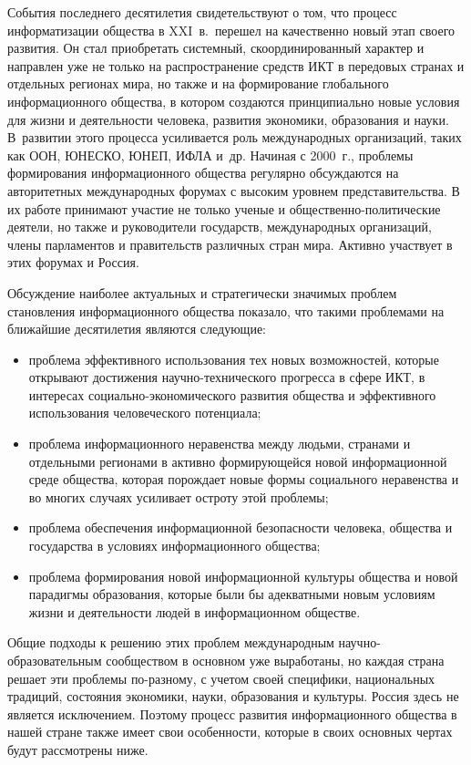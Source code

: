 \begin{multicols}{2}
   События последнего десятилетия свидетельствуют о том, что процесс информатизации
общества в XXI~в.\ перешел на качественно новый этап своего развития. Он стал 
приобретать системный, скоординированный характер и направлен уже не только на 
распространение средств ИКТ в передовых странах и отдельных регионах мира, но 
также и на формирование глобального информационного общества, в котором 
создаются принципиально новые условия для жизни и деятельности человека, 
развития экономики, образования и науки. В~развитии этого процесса усиливается 
роль международных организаций, таких как ООН, ЮНЕСКО, ЮНЕП, ИФЛА и~др. Начиная 
с 2000~г., проблемы формирования информационного общества регулярно обсуждаются 
на авторитетных международных форумах с высоким уровнем представительства. В их 
работе принимают участие не только ученые и общественно-политические деятели, 
но также и руководители государств, международных организаций, члены 
парламентов и правительств различных стран мира. Активно участвует в этих 
форумах и Россия.

   Обсуждение наиболее актуальных и стратегически значимых проблем становления
информационного общества показало, что такими проблемами на ближайшие десятилетия
являются следующие:
   \begin{itemize}
\item проблема эффективного использования тех новых возможностей, которые
открывают достижения научно-технического прогресса в сфере ИКТ, в интересах
социально-эко\-но\-ми\-че\-ско\-го развития общества и эффективного использования
человеческого потенциала;
\item проблема информационного неравенства между людьми, странами и
отдельными регионами в активно формирующейся новой информационной среде
общества, которая порождает новые формы социального неравенства и во многих
случаях усиливает остроту этой проблемы;
\item проблема обеспечения информационной безопас\-ности человека, общества и
государства в условиях информационного общества;
\item проблема формирования новой информационной культуры общества и
новой парадигмы образования, которые были бы адекватными новым условиям
жизни и деятельности людей в информационном обществе.
\end{itemize}

   Общие подходы к решению этих проблем международным научно-образовательным
сообществом в основном уже выработаны, но каждая страна решает эти проблемы 
по-разному, с учетом своей специфики, национальных традиций, состояния экономики,
науки, образования и культуры. Россия здесь не является исключением. Поэтому процесс
развития информационного общества в нашей стране также имеет свои особенности,
которые в своих основных чертах будут рассмотрены ниже.


\end{multicols}
